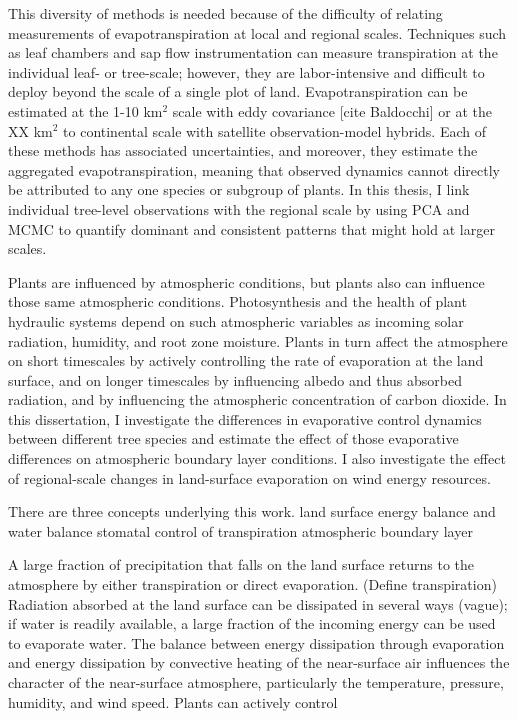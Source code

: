 This diversity of methods is needed because of the difficulty of relating measurements of evapotranspiration at local and regional scales.  Techniques such as leaf chambers and sap flow instrumentation can measure transpiration at the individual leaf- or tree-scale; however, they are labor-intensive and difficult to deploy beyond the scale of a single plot of land.  Evapotranspiration can be estimated at the 1-10 km$^2$ scale with eddy covariance [cite Baldocchi] or at the XX km$^2$ to continental scale with satellite observation-model hybrids.  Each of these methods has associated uncertainties, and moreover, they estimate the aggregated evapotranspiration, meaning that observed dynamics cannot directly be attributed to any one species or subgroup of plants.  In this thesis, I link individual tree-level observations with the regional  scale by using PCA and MCMC to quantify dominant and consistent patterns that might hold at larger scales.

\hline

Plants are influenced by atmospheric conditions, but plants also can influence those same atmospheric conditions.  Photosynthesis and the health of plant hydraulic systems depend on such atmospheric variables as incoming solar radiation, humidity, and root zone moisture.  Plants in turn affect the atmosphere on short timescales by actively controlling the rate of evaporation at the land surface, and on longer timescales by influencing albedo and thus absorbed radiation, and by influencing the atmospheric concentration of carbon dioxide.  In this dissertation, I investigate the differences in evaporative control dynamics between different tree species and estimate the effect of those evaporative differences on atmospheric boundary layer conditions.  I also investigate the effect of regional-scale changes in land-surface evaporation on wind energy resources.

There are three concepts underlying this work.
land surface energy balance and water balance
stomatal control of transpiration
atmospheric boundary layer

A large fraction of precipitation that falls on the land surface returns to the atmosphere by either transpiration or direct evaporation.  (Define transpiration)
Radiation absorbed at the land surface can be dissipated in several ways (vague); if water is readily available, a large fraction of the incoming energy can be used to evaporate water.  The balance between energy dissipation through evaporation and energy dissipation by convective heating of the near-surface air influences the character of the near-surface atmosphere, particularly the temperature, pressure, humidity, and wind speed.
Plants can actively control 

